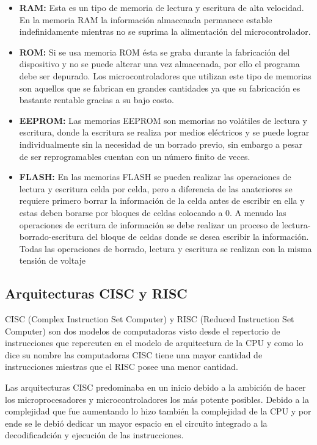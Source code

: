 \documentclass[letterpaper,12pt,oneside]{book}
\begin{document}
				\begin{itemize}
					\item \textbf{RAM:} Esta es un tipo de memoria de lectura y escritura de alta velocidad. En la memoria RAM la información almacenada permanece estable indefinidamente mientras no se suprima la alimentación del microcontrolador.

					\item \textbf{ROM:} Si se usa memoria ROM ésta se graba durante la fabricación del dispositivo y no se puede alterar una vez almacenada, por ello el programa debe ser depurado. Los microcontroladores que utilizan este tipo de memorias son aquellos que se fabrican en grandes cantidades ya que su fabricación es bastante rentable gracias a su bajo costo. 

					\item \textbf{EEPROM:} Las memorias EEPROM son memorias no volátiles de lectura y escritura, donde la escritura se realiza por medios eléctricos y se puede lograr individualmente sin la necesidad de un borrado previo, sin embargo a pesar de ser reprogramables cuentan con un número finito de veces.

					\item \textbf{FLASH:} En las memorias FLASH se pueden realizar las operaciones de lectura y escritura celda por celda, pero a diferencia de las anateriores se requiere primero borrar la información de la celda antes de escribir en ella y estas deben borarse por bloques de celdas colocando a 0. A menudo las operaciones de ecritura de información se debe realizar un proceso de lectura-borrado-escritura del bloque de celdas donde se desea escribir la información. Todas las operaciones de borrado, lectura y escritura se realizan con la misma tensión de voltaje
				\end{itemize}

			\subsection{Arquitecturas CISC y RISC}
			CISC (Complex Instruction Set Computer) y RISC (Reduced Instruction Set Computer) son dos modelos de computadoras visto desde el repertorio de instrucciones que repercuten en el modelo de arquitectura de la CPU y como lo dice su nombre las computadoras CISC tiene una mayor cantidad de instrucciones miestras que el RISC posee una menor cantidad.

			Las arquitecturas CISC predominaba en un inicio debido a la ambición de hacer los microprocesadores y microcontroladores los más potente posibles. Debido a la complejidad que fue aumentando lo hizo también la complejidad de la CPU y por ende se le debió dedicar un mayor espacio en el circuito integrado a la decodificadción y ejecución de las instrucciones.
\end{document}
